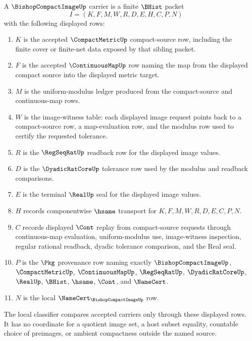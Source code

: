 \begin{definition}
\label{def:bishop-compact-image-carrier}
A $\BishopCompactImageUp$ carrier is a finite $\BHist$ packet
$$
I=(K,F,M,W,R,D,E,H,C,P,N)
$$
with the following displayed rows:
\begin{enumerate}
\item $K$ is the accepted $\CompactMetricUp$ compact-source row, including the finite cover or finite-net data exposed by that sibling packet.
\item $F$ is the accepted $\ContinuousMapUp$ row naming the map from the displayed compact source into the displayed metric target.
\item $M$ is the uniform-modulus ledger produced from the compact-source and continuous-map rows.
\item $W$ is the image-witness table: each displayed image request points back to a compact-source row, a map-evaluation row, and the modulus row used to certify the requested tolerance.
\item $R$ is the $\RegSeqRatUp$ readback row for the displayed image values.
\item $D$ is the $\DyadicRatCoreUp$ tolerance row used by the modulus and readback comparisons.
\item $E$ is the terminal $\RealUp$ seal for the displayed image values.
\item $H$ records componentwise $\hsame$ transport for $K,F,M,W,R,D,E,C,P,N$.
\item $C$ records displayed $\Cont$ replay from compact-source requests through continuous-map evaluation, uniform-modulus use, image-witness inspection, regular rational readback, dyadic tolerance comparison, and the Real seal.
\item $P$ is the $\Pkg$ provenance row naming exactly $\BishopCompactImageUp$, $\CompactMetricUp$, $\ContinuousMapUp$, $\RegSeqRatUp$, $\DyadicRatCoreUp$, $\RealUp$, $\BHist$, $\hsame$, $\Cont$, and $\NameCert$.
\item $N$ is the local $\NameCert_{\BishopCompactImageUp}$ row.
\end{enumerate}
The local classifier compares accepted carriers only through these displayed rows. It has no coordinate for a quotient image set, a host subset equality, countable choice of preimages, or ambient compactness outside the named source.
\end{definition}


